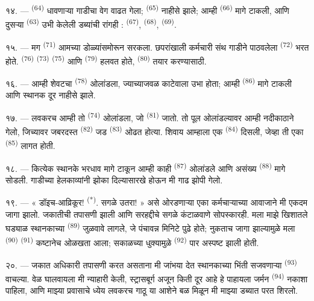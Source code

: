 \VUsaut{3.0mm}
\VUsaut{3.0mm}

१४. ---  \textsuperscript{(64)} धावणाऱ्या गाडीचा वेग वाढत गेला;
 \textsuperscript{(65)} नाहीसे झाले; आम्ही 
\textsuperscript{(66)} मागे टाकली, आणि दुसऱ्या  \textsuperscript{(63)} उभी
केलेली डब्यांची रांगही :  \textsuperscript{(67)}, 
\textsuperscript{(68)},  \textsuperscript{(69)}.


१५. --- मग  \textsuperscript{(71)} आमच्या डोळ्यांसमोरून सरकला. छपरांखाली
कर्मचारी संथ गाडीने पाठवलेला  \textsuperscript{(72)} भरत होते.
 \textsuperscript{(76)}  \textsuperscript{(73)}
 \textsuperscript{(75)} आणि  \textsuperscript{(79)}
हलवत होते,  \textsuperscript{(80)} तयार करण्यासाठी.

१६. --- आम्ही शेवटचा  \textsuperscript{(78)} ओलांडला, ज्याच्याजवळ काटेवाला उभा
होता; आम्ही  \textsuperscript{(86)} मागे टाकली आणि स्थानक दूर नाहीसे झाले.

१७. --- लवकरच आम्ही तो  \textsuperscript{(74)} ओलांडला, जो 
\textsuperscript{(81)} जातो. तो पूल ओलांडल्यावर आम्ही नदीकाठाने गेलो, जिच्यावर जबरदस्त
 \textsuperscript{(82)} जड  \textsuperscript{(83)} ओढत
होत्या. शिवाय आम्हाला एक  \textsuperscript{(84)} दिसली, जेव्हा ती एका
 \textsuperscript{(85)} लागत होती.

१८. --- कित्येक स्थानके भरधाव मागे टाकून आम्ही काही  \textsuperscript{(87)}
ओलांडले आणि  असंख्य  \textsuperscript{(88)} मागे सोडली.
गाडीच्या हेलकाव्यांनी झोका दिल्यासारखे होऊन मी गाढ झोपी गेलो.

\VUsaut{3.0mm}
\VUsaut{3.0mm}

१९. --- « डॉइच-आव्रिकूर! \textsuperscript{(*)}. सगळे उतरा! » असे ओरडणाऱ्या एका कर्मचाऱ्याच्या
आवाजाने मी एकदम जागा झालो. जकातीची तपासणी झाली आणि सरहद्दीचे सगळे कंटाळवाणे सोपस्कारही. मला
माझे खिशातले घड्याळ स्थानकाच्या  \textsuperscript{(89)} जुळवावे
लागले, जे पंचावन्न मिनिटे पुढे होते; नुकताच जागा झाल्यामुळे मला 
\textsuperscript{(90)}  \textsuperscript{(91)} कष्टानेच ओळखता आला; सकाळच्या
धुक्यामुळे  \textsuperscript{(92)} पार अस्पष्ट झाली होती.

२०. --- जकात अधिकारी तपासणी करत असताना मी जांभया देत स्थानकाच्या भिंती सजवणाऱ्या
 \textsuperscript{(93)} वाचल्या. वेळ घालवायला मी न्याहारी केली, स्ट्रासबूर्ग
अजून किती दूर आहे हे पाहायला जर्मन  \textsuperscript{(94)} नकाशा पाहिला, आणि
माझ्या प्रवासाचे ध्येय लवकरच गाठू या आशेने बळ मिळून मी माझ्या डब्यात परत शिरलो.

\VUsaut{6.0mm}
\VUfilet{22mm}
